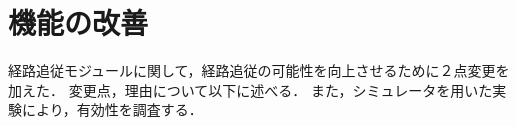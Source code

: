 \chapter{機能の改善}
\label{chap:method}
経路追従モジュールに関して，経路追従の可能性を向上させるために２点変更を加えた．
変更点，理由について以下に述べる．
また，シミュレータを用いた実験により，有効性を調査する．




